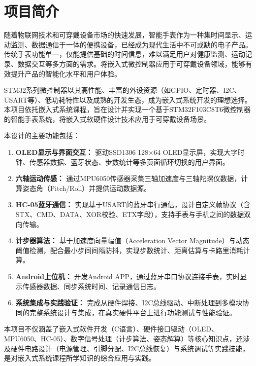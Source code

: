 
\section{项目简介}

随着物联网技术和可穿戴设备市场的快速发展，智能手表作为一种集时间显示、运动监测、数据通信于一体的便携设备，已经成为现代生活中不可或缺的电子产品。传统手表功能单一，仅能提供基础的时间信息，难以满足用户对健康监测、运动记录、数据交互等多方面的需求。将嵌入式微控制器应用于可穿戴设备领域，能够有效提升产品的智能化水平和用户体验。

STM32系列微控制器以其高性能、丰富的外设资源（如GPIO、定时器、I2C、USART等）、低功耗特性以及成熟的开发生态，成为嵌入式系统开发的理想选择。本项目依托嵌入式系统课程，旨在设计并实现一个基于STM32F103C8T6微控制器的智能手表系统，将嵌入式软硬件设计技术应用于可穿戴设备场景。

本设计的主要功能包括：
\begin{enumerate}
    \item \textbf{OLED显示与界面交互：} 驱动SSD1306 128$\times$64 OLED显示屏，实现大字时钟、传感器数据、蓝牙状态、步数统计等多页面循环切换的用户界面。
    \item \textbf{六轴运动传感：} 通过MPU6050传感器采集三轴加速度与三轴陀螺仪数据，计算姿态角（Pitch/Roll）并提供运动数据源。
    \item \textbf{HC-05蓝牙通信：} 实现基于USART的蓝牙串行通信，设计自定义帧协议（含STX、CMD、DATA、XOR校验、ETX字段），支持手表与手机之间的数据双向传输。
    \item \textbf{计步器算法：} 基于加速度向量幅值（Acceleration Vector Magnitude）与动态阈值检测，配合最小步间间隔防抖，实现步数统计、距离估算与卡路里消耗计算。
    \item \textbf{Android上位机：} 开发Android APP，通过蓝牙串口协议连接手表，实时显示传感器数据、同步系统时间、记录通信日志。
    \item \textbf{系统集成与实践验证：} 完成从硬件焊接、I2C总线驱动、中断处理到多模块协同的完整系统设计与集成，在真实硬件平台上进行功能测试与性能验证。
\end{enumerate}

本项目不仅涵盖了嵌入式软件开发（C语言）、硬件接口驱动（OLED、MPU6050、HC-05）、数字信号处理（计步算法、姿态解算）等核心知识点，还涉及硬件电路设计（电源管理、引脚分配、I2C总线恢复）与系统调试等实践技能，是对嵌入式系统课程所学知识的综合应用与实践。